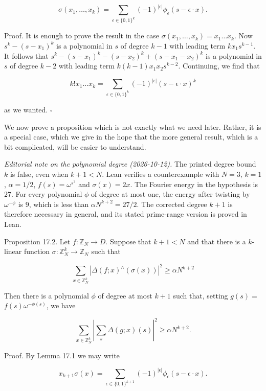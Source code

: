 \documentclass[10pt]{article}
\begin{document}
$$
\sigma\left(x_{1}, \ldots, x_{k}\right)=\sum_{\epsilon \in\{0,1\}^{k}}(-1)^{|\epsilon|} \phi_{\epsilon}(s-\epsilon \cdot x) .
$$

Proof. It is enough to prove the result in the case $\sigma\left(x_{1}, \ldots, x_{k}\right)=x_{1} \ldots x_{k}$. Now $s^{k}-\left(s-x_{1}\right)^{k}$ is a polynomial in $s$ of degree $k-1$ with leading term $k x_{1} s^{k-1}$. It follows that $s^{k}-\left(s-x_{1}\right)^{k}-\left(s-x_{2}\right)^{k}+\left(s-x_{1}-x_{2}\right)^{k}$ is a polynomial in $s$ of degree $k-2$ with leading term $k(k-1) x_{1} x_{2} s^{k-2}$. Continuing, we find that

$$
k!x_{1} \ldots x_{k}=\sum_{\epsilon \in\{0,1\}^{k}}(-1)^{|\epsilon|}(s-\epsilon \cdot x)^{k}
$$

as we wanted. \(\square\)

We now prove a proposition which is not exactly what we need later. Rather, it is a special case, which we give in the hope that the more general result, which is a bit complicated, will be easier to understand.

\emph{Editorial note on the polynomial degree (2026-10-12).}
The printed degree bound $k$ is false, even when $k+1<N$. Lean verifies
a counterexample with $N=3$, $k=1$, $\alpha=1/2$,
$f(s)=\omega^{s^2}$ and $\sigma(x)=2x$. The Fourier energy in the
hypothesis is $27$. For every polynomial $\phi$ of degree at most one,
the energy after twisting by $\omega^{-\phi}$ is $9$, which is less than
$\alpha N^{k+2}=27/2$. The corrected degree $k+1$ is therefore necessary
in general, and its stated prime-range version is proved in Lean.

Proposition 17.2. Let $f: \mathbb{Z}_{N} \rightarrow D$. Suppose that $k+1<N$ and that there is a $k$-linear function $\sigma: \mathbb{Z}_{N}^{k} \rightarrow \mathbb{Z}_{N}$ such that

$$
\sum_{x \in \mathbb{Z}_{N}^{k}}\left|\Delta(f ; x)^{\wedge}(\sigma(x))\right|^{2} \geqslant \alpha N^{k+2}
$$

Then there is a polynomial $\phi$ of degree at most $k+1$ such that, setting $g(s)=$ $f(s) \omega^{-\phi(s)}$, we have

$$
\sum_{x \in \mathbb{Z}_{N}^{k}}\left|\sum_{s} \Delta(g ; x)(s)\right|^{2} \geqslant \alpha N^{k+2} .
$$

Proof. By Lemma 17.1 we may write

$$
x_{k+1} \sigma(x)=\sum_{\epsilon \in\{0,1\}^{k+1}}(-1)^{|\epsilon|}\phi_{\epsilon}(s-\epsilon \cdot x) .
$$
\end{document}
